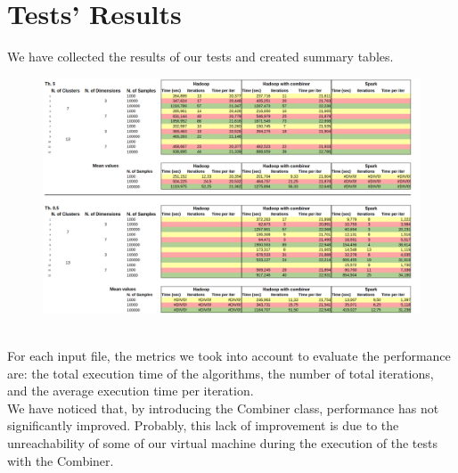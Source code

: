 \documentclass[a4paper, oneside]{article}
\begin{document}
\clearpage

\section{Tests' Results}
We have collected the results of our tests and created summary tables.
\begin{figure}[h]
\centering
\includegraphics[width=1\textwidth]{images/tables}
\end{figure}\\
For each input file, the metrics we took into account to evaluate the performance are: the total execution time of the algorithms, the number of total iterations, and the average execution time per iteration. \\
We have noticed that, by introducing the Combiner class, performance has not significantly improved. Probably, this lack of improvement is due to the unreachability of some of our virtual machine during the execution of the tests with the Combiner.
\end{document}

